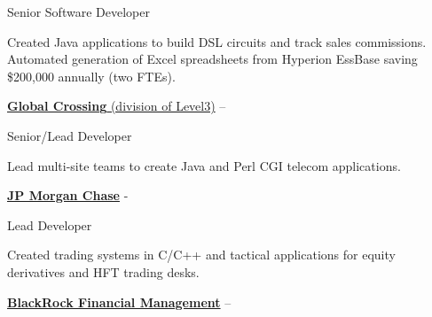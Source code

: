 \documentclass[letterpaper,MMMMyyyy,nonstopmode]{simpleresumecv}
\newcommand{\comment}[1]{\ignorespaces} %
\newif\ifLOCATION
\begin{document}
\begin{Body}
Senior Software Developer
\ifLOCATION
\hfill
Rochester, New York
\fi

\begin{Detail}
\Item
Created Java applications to build DSL circuits and track sales commissions\comment{; CruiseControl used for Continuous Integration}. 
Automated generation of \comment{20} Excel spreadsheets from Hyperion EssBase saving \$200,000 annually (two FTEs).

\end{Detail}

\BigGap
\Entry
\href{http://www.globalcrossing.com/}
{\textbf{Global  Crossing} (division of Level3)}
\hfill 
 -- 

Senior/Lead Developer
\ifLOCATION
\hfill
Rochester, New York
\fi

\begin{Detail}
\Item
Lead multi-site teams to create Java and Perl CGI telecom applications.

\end{Detail}

\BigGap
\Entry
\href{http://www.jpmorganchase.com/}
{\textbf{JP Morgan Chase}}
\hfill 
 - 

Lead Developer
\ifLOCATION
\hfill
New York, New York
\fi

\begin{Detail}
\Item
Created trading systems in C/C++ and tactical applications for equity derivatives and HFT trading desks.

\end{Detail}

\BigGap
\Entry
\href{http://www.blackrock.com/}
{\textbf{BlackRock Financial Management}}
\hfill 
 --  


\end{Body}
\end{document}
